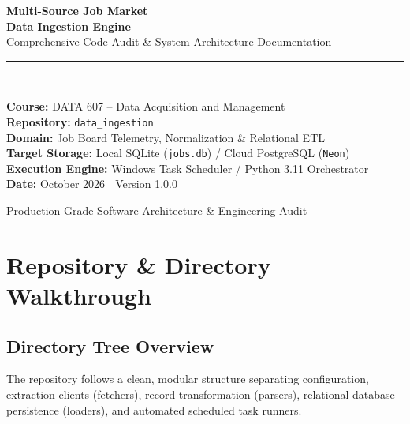 \documentclass[10pt,letterpaper]{article}
\begin{document}
\begin{titlepage}
    \centering
    \vspace*{1.5cm}
    
    {\Huge \bfseries \sffamily \color{primary} Multi-Source Job Market\\[0.3em] Data Ingestion Engine}\\[1.5em]
    {\Large \sffamily \color{secondary} Comprehensive Code Audit \& System Architecture Documentation}\\[2.5em]
    
    \rule{0.6\textwidth}{1.2pt}\\[2.5em]
    
    \begin{minipage}{0.8\textwidth}
        \sffamily \normalsize
        \textbf{Course:} DATA 607 -- Data Acquisition and Management\\
        \textbf{Repository:} \texttt{data\_ingestion}\\
        \textbf{Domain:} Job Board Telemetry, Normalization \& Relational ETL\\
        \textbf{Target Storage:} Local SQLite (\texttt{jobs.db}) / Cloud PostgreSQL (\texttt{Neon})\\
        \textbf{Execution Engine:} Windows Task Scheduler / Python 3.11 Orchestrator\\
        \textbf{Date:} October 2026 $\vert$ Version 1.0.0
    \end{minipage}
    
    \vfill
    
    {\small \textsf{Production-Grade Software Architecture \& Engineering Audit}}
    \vspace*{1cm}
\end{titlepage}

\tableofcontents
\newpage

\section{Repository \& Directory Walkthrough}

\subsection{Directory Tree Overview}

The repository follows a clean, modular structure separating configuration, extraction clients (fetchers), record transformation (parsers), relational database persistence (loaders), and automated scheduled task runners.
\end{document}
